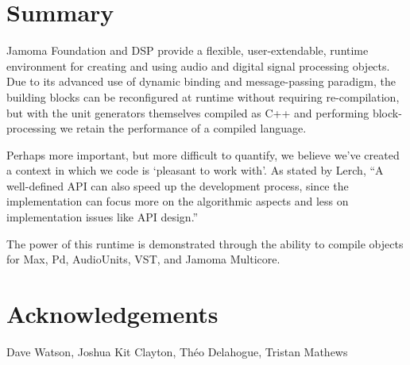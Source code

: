 \documentclass[twoside,10pt]{article}
\begin{document}




\section{Summary} %

Jamoma Foundation and DSP provide a flexible, user-extendable, runtime environment for creating and using audio and digital signal processing objects.  Due to its advanced use of dynamic binding and message-passing paradigm, the building blocks can be reconfigured at runtime without requiring re-compilation, but with the unit generators themselves compiled as C++ and performing block-processing we retain the performance of a compiled language.

Perhaps more important, but more difficult to quantify, we believe we've created a context in which we code is `pleasant to work with'.  As stated by Lerch, ``A well-defined API can also speed up the development process, since the implementation can focus more on the algorithmic aspects and less on implementation issues like API design.'' \cite{Lerch:2005}

The power of this runtime is demonstrated through the ability to compile objects for Max, Pd, AudioUnits, VST, and Jamoma Multicore.




\section{Acknowledgements} %

Dave Watson, Joshua Kit Clayton, Th\'eo Delahogue, Tristan Mathews





\end{document}
